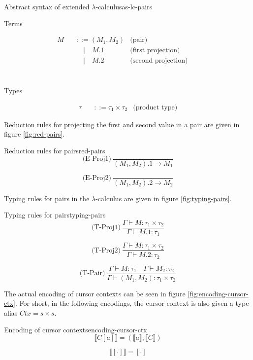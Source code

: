 \documentclass{article}
\begin{document}
\begin{myfigure}{Abstract syntax of extended $\lambda$-calculus}{as-lc-pairs}
\begin{center}
Terms
\end{center}
\[
\begin{aligned}
M \quad &::= (M_1,M_2) &\text{(pair)} &&\\
& \quad | \quad M.1 &\text{(first projection)} &&\\
& \quad | \quad M.2 &\text{(second projection)} &&\\
\end{aligned}
\]
\\
\begin{center}
Types
\end{center}
\[
\begin{aligned}
\tau \quad &::= \tau_1 \times \tau_2 &\text{(product type)}
\end{aligned}
\]
\end{myfigure}

Reduction rules for projecting the first and second value in a pair are given in figure \ref{fig:red-pairs}.

\begin{myfigure}{Reduction rules for pairs}{red-pairs}
\[
\text{(E-Proj1)} \ \frac{}{(M_1,M_2).1 \rightarrow M_1}
\]

\[
\text{(E-Proj2)} \ \frac{}{(M_1,M_2).2 \rightarrow M_2}
\]
\end{myfigure}

Typing rules for pairs in the $\lambda$-calculus are given in figure \ref{fig:typing-pairs}.

\begin{myfigure}{Typing rules for pairs}{typing-pairs}
\[
\text{(T-Proj1)} \ \frac{\Gamma \vdash M : \tau_1 \times \tau_2}{\Gamma \vdash M.1 : \tau_1}
\]

\[
\text{(T-Proj2)} \ \frac{\Gamma \vdash M : \tau_1 \times \tau_2}{\Gamma \vdash M.2 : \tau_2}
\]

\[
\text{(T-Pair)} \ \frac{\Gamma \vdash M : \tau_1 \quad \Gamma \vdash M_2 : \tau_2}{\Gamma \vdash (M_1,M_2) : \tau_1 \times \tau_2}
\]
\end{myfigure}

The actual encoding of cursor contexts can be seen in figure \ref{fig:encoding-cursor-ctx}. For short, in the following encodings, the cursor context is also given a type alias $Ctx = s \times s$.

\begin{myfigure}{Encoding of cursor contexts}{encoding-cursor-ctx}
\[
\llbracket C[a] \rrbracket = (\llbracket a \rrbracket, \llbracket C \rrbracket)
\]

\[
\llbracket [\cdot] \rrbracket = [\cdot]
\]
\end{myfigure}
\end{document}

